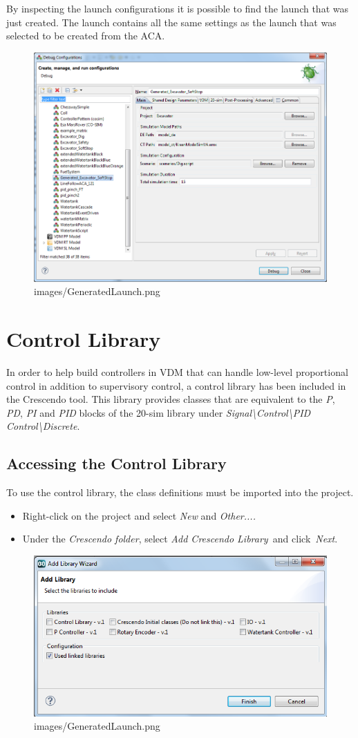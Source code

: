 \documentclass{crescendorepchap}
\begin{document}
By inspecting the launch configurations it is possible to find the launch
that was just created. The launch contains all the same settings as the
launch that was selected to be created from the ACA.

\begin{figure}[htbp]
\centering
\includegraphics[width=.6\textwidth]{images/GeneratedLaunch.png}
\caption{images/GeneratedLaunch.png}
\end{figure}

\section{Control Library}

In order to help build controllers in VDM that can handle low-level
proportional control in addition to supervisory control, a control
library has been included in the Crescendo tool. This library provides
classes that are equivalent to the \emph{P}, \emph{PD}, \emph{PI}
and \emph{PID} blocks of the 20-sim library under
\emph{Signal\textbackslash{}Control\textbackslash{}PID
Control\textbackslash{}Discrete}.

\subsection{Accessing the Control Library}

To use the control library, the class definitions must be imported into
the project.

\begin{itemize}
\item
  Right-click on the project and select \emph{New} and \emph{Other....}
\item
  Under the \emph{Crescendo folder}, select \emph{Add Crescendo
  Library~}and click~\emph{Next}.
\end{itemize}

\begin{figure}[htbp]
\centering
\includegraphics[width=.6\textwidth]{images/DestecsAddNewLibrary.png}
\caption{images/GeneratedLaunch.png}
\end{figure}
\end{document}
